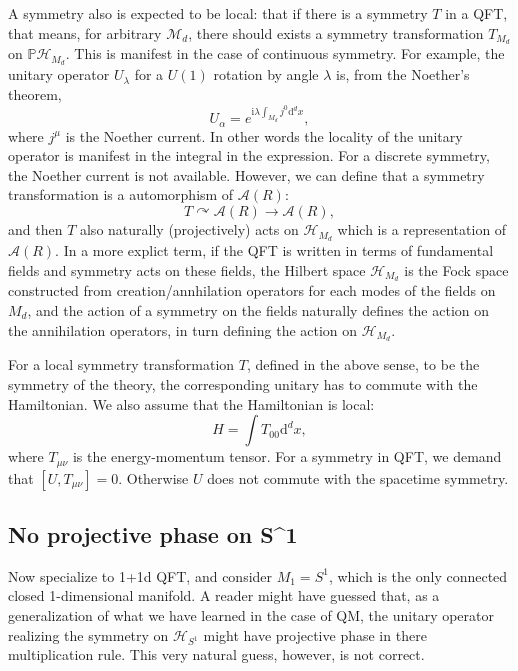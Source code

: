 \documentclass[
]{scrartcl}
\numberwithin{equation}{section}
\theoremstyle{definition}
\theoremstyle{definition}
\theoremstyle{definition}
\theoremstyle{definition}
\theoremstyle{remark}
\begin{document}
A symmetry also is expected to be local: that if there is a symmetry \(T\) in a QFT, that means, for arbitrary \(\mathcal{M}_d\),
there should exists a symmetry transformation \(T_{M_d}\) on \(\mathbb{P}\mathcal{H}_{M_d}\).
This is manifest in the case of continuous symmetry.
For example, the unitary operator \(U_\lambda\) for a \(U(1)\) rotation by angle \(\lambda\) is, from the Noether's theorem,
\begin{equation}
    \label{eq:Noether}
    U_\alpha = e^{\mathrm{i}\lambda \int_{M_d}j^0 \mathrm{d}^dx},
\end{equation}
where \(j^\mu\) is the Noether current.
In other words the locality of the unitary operator is manifest in the integral in the expression.
For a discrete symmetry, the Noether current is not available.
However, we can define that a symmetry transformation is a automorphism of \(\mathcal{A}(R)\):
\begin{equation}
    \label{eq:TonAR}
    T \curvearrowright \mathcal{A}(R) \to \mathcal{A}(R),
\end{equation}
and then \(T\) also naturally (projectively) acts on \(\mathcal{H}_{M_d}\) which is a representation of \(\mathcal{A}(R)\).
In a more explict term, if the QFT is written in terms of fundamental fields and symmetry acts on these fields,
the Hilbert space \(\mathcal{H}_{M_d}\) is the Fock space constructed from creation/annhilation operators for each modes of the fields on \(M_d\),
and the action of a symmetry on the fields naturally defines the action on the annihilation operators, in turn defining the action on \(\mathcal{H}_{M_d}\).

For a local symmetry transformation \(T\), defined in the above sense, to be the symmetry of the theory, the corresponding unitary has to commute with the Hamiltonian.
We also assume that the Hamiltonian is local:
\begin{equation}
    \label{eq:localHam}
    H = \int T_{00} \mathrm{d}^dx,
\end{equation}
where \(T_{\mu\nu}\) is the energy-momentum tensor.
For a symmetry in QFT, we demand that \([U,T_{\mu\nu}] = 0\). Otherwise \(U\) does not commute with the spacetime symmetry.

\hypertarget{no-projective-phase-on-s1}{%
\subsection{No projective phase on S\^{}1}\label{no-projective-phase-on-s1}}

Now specialize to 1+1d QFT, and consider \(M_1 = S^1\), which is the only connected closed 1-dimensional manifold.
A reader might have guessed that, as a generalization of what we have learned in the case of QM, the unitary operator realizing the symmetry on \(\mathcal{H}_{S^1}\) might have projective phase in there multiplication rule.
This very natural guess, however, is not correct.
\end{document}
